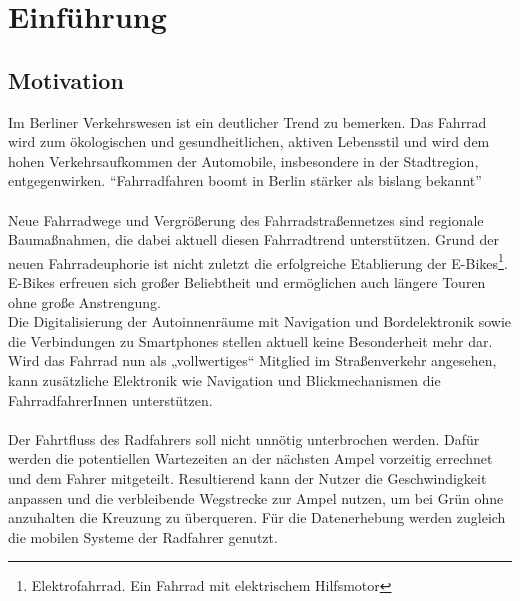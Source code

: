 \chapter{Einführung}
\section{Motivation}
Im Berliner Verkehrswesen ist ein deutlicher Trend zu bemerken. Das Fahrrad wird zum ökologischen und gesundheitlichen, aktiven Lebensstil und wird dem hohen Verkehrsaufkommen der Automobile, insbesondere in der Stadtregion, entgegenwirken. “Fahrradfahren boomt in Berlin stärker als bislang bekannt”\cite{Mopo}\\\\
Neue Fahrradwege und Vergrößerung des Fahrradstraßennetzes sind regionale Baumaßnahmen, die dabei aktuell diesen Fahrradtrend unterstützen. Grund der neuen Fahrradeuphorie ist nicht zuletzt die erfolgreiche Etablierung der E-Bikes\footnote{Elektrofahrrad. Ein Fahrrad mit elektrischem Hilfsmotor}. E-Bikes erfreuen sich großer Beliebtheit und ermöglichen auch längere Touren ohne große Anstrengung.\\ Die Digitalisierung der Autoinnenräume mit Navigation und Bordelektronik sowie die Verbindungen zu Smartphones stellen aktuell keine Besonderheit mehr dar. Wird das Fahrrad nun als „vollwertiges“ Mitglied im Straßenverkehr angesehen, kann zusätzliche Elektronik wie Navigation und Blickmechanismen die FahrradfahrerInnen unterstützen.\\\\ 
Der Fahrtfluss des Radfahrers soll nicht unnötig unterbrochen werden. Dafür werden die potentiellen Wartezeiten an der nächsten Ampel vorzeitig errechnet und dem Fahrer mitgeteilt. Resultierend kann der Nutzer die Geschwindigkeit anpassen und die verbleibende Wegstrecke zur Ampel nutzen, um bei Grün ohne anzuhalten die Kreuzung zu überqueren. Für die Datenerhebung werden zugleich die mobilen Systeme der Radfahrer genutzt.
